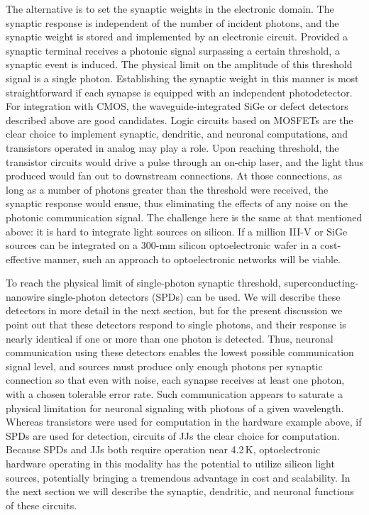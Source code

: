 The alternative is to set the synaptic weights in the electronic domain. The synaptic response is independent of the number of incident photons, and the synaptic weight is stored and implemented by an electronic circuit. Provided a synaptic terminal receives a photonic signal surpassing a certain threshold, a synaptic event is induced. The physical limit on the amplitude of this threshold signal is a single photon. Establishing the synaptic weight in this manner is most straightforward if each synapse is equipped with an independent photodetector. For integration with CMOS, the waveguide-integrated SiGe or defect detectors described above are good candidates. Logic circuits based on MOSFETs are the clear choice to implement synaptic, dendritic, and neuronal computations, and transistors operated in analog may play a role. Upon reaching threshold, the transistor circuits would drive a pulse through an on-chip laser, and the light thus produced would fan out to downstream connections. At those connections, as long as a number of photons greater than the threshold were received, the synaptic response would ensue, thus eliminating the effects of any noise on the photonic communication signal. The challenge here is the same at that mentioned above: it is hard to integrate light sources on silicon. If a million III-V or SiGe sources can be integrated on a 300-mm silicon optoelectronic wafer in a cost-effective manner, such an approach to optoelectronic networks will be viable.

To reach the physical limit of single-photon synaptic threshold, superconducting-nanowire single-photon detectors (SPDs) can be used. We will describe these detectors in more detail in the next section, but for the present discussion we point out that these detectors respond to single photons, and their response is nearly identical \cite{} if one or more than one photon is detected. Thus, neuronal communication using these detectors enables the lowest possible communication signal level, and sources must produce only enough photons per synaptic connection so that even with noise, each synapse receives at least one photon, with a chosen tolerable error rate. Such communication appears to saturate a physical limitation for neuronal signaling with photons of a given wavelength. Whereas transistors were used for computation in the hardware example above, if SPDs are used for detection, circuits of JJs the clear choice for computation. Because SPDs and JJs both require operation near 4.2\,K, optoelectronic hardware operating in this modality has the potential to utilize silicon light sources, potentially bringing a tremendous advantage in cost and scalability. In the next section we will describe the synaptic, dendritic, and neuronal functions of these circuits. 





